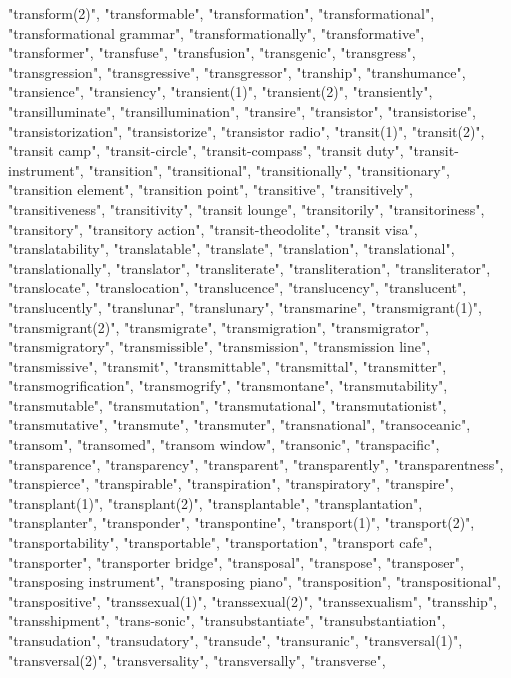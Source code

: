 "transform(2)",
"transformable",
"transformation",
"transformational",
"transformational grammar",
"transformationally",
"transformative",
"transformer",
"transfuse",
"transfusion",
"transgenic",
"transgress",
"transgression",
"transgressive",
"transgressor",
"tranship",
"transhumance",
"transience",
"transiency",
"transient(1)",
"transient(2)",
"transiently",
"transilluminate",
"transillumination",
"transire",
"transistor",
"transistorise",
"transistorization",
"transistorize",
"transistor radio",
"transit(1)",
"transit(2)",
"transit camp",
"transit-circle",
"transit-compass",
"transit duty",
"transit-instrument",
"transition",
"transitional",
"transitionally",
"transitionary",
"transition element",
"transition point",
"transitive",
"transitively",
"transitiveness",
"transitivity",
"transit lounge",
"transitorily",
"transitoriness",
"transitory",
"transitory action",
"transit-theodolite",
"transit visa",
"translatability",
"translatable",
"translate",
"translation",
"translational",
"translationally",
"translator",
"transliterate",
"transliteration",
"transliterator",
"translocate",
"translocation",
"translucence",
"translucency",
"translucent",
"translucently",
"translunar",
"translunary",
"transmarine",
"transmigrant(1)",
"transmigrant(2)",
"transmigrate",
"transmigration",
"transmigrator",
"transmigratory",
"transmissible",
"transmission",
"transmission line",
"transmissive",
"transmit",
"transmittable",
"transmittal",
"transmitter",
"transmogrification",
"transmogrify",
"transmontane",
"transmutability",
"transmutable",
"transmutation",
"transmutational",
"transmutationist",
"transmutative",
"transmute",
"transmuter",
"transnational",
"transoceanic",
"transom",
"transomed",
"transom window",
"transonic",
"transpacific",
"transparence",
"transparency",
"transparent",
"transparently",
"transparentness",
"transpierce",
"transpirable",
"transpiration",
"transpiratory",
"transpire",
"transplant(1)",
"transplant(2)",
"transplantable",
"transplantation",
"transplanter",
"transponder",
"transpontine",
"transport(1)",
"transport(2)",
"transportability",
"transportable",
"transportation",
"transport cafe",
"transporter",
"transporter bridge",
"transposal",
"transpose",
"transposer",
"transposing instrument",
"transposing piano",
"transposition",
"transpositional",
"transpositive",
"transsexual(1)",
"transsexual(2)",
"transsexualism",
"transship",
"transshipment",
"trans-sonic",
"transubstantiate",
"transubstantiation",
"transudation",
"transudatory",
"transude",
"transuranic",
"transversal(1)",
"transversal(2)",
"transversality",
"transversally",
"transverse",
